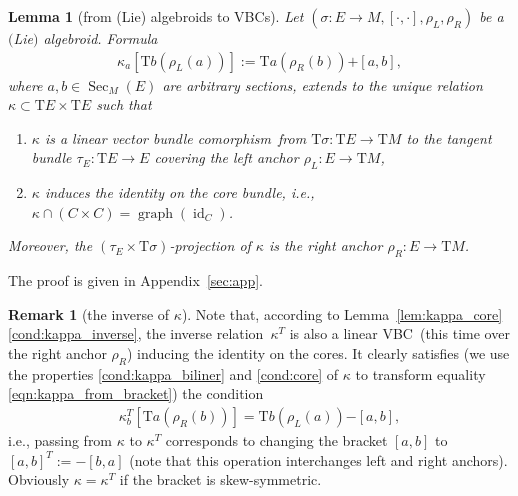 \documentclass[10pt,a4paper]{amsart}
\newcommand{\ZM}{{VBC}} %
\newcommand{\Zakrzewski}{{vector bundle comorphism}}
\newcommand{\graf}{\operatorname{graph}}
\newcommand{\Sec}{\operatorname{Sec}}
\newcommand{\id}{\operatorname{id}}
\newcommand{\ra}{\rightarrow}
\newcommand{\plus}{\boldsymbol{\pmb{+}}}
\newcommand{\minus}{\boldsymbol{\pmb{-}}}
\newcommand{\rhoL}{\rho_L} %
\newcommand{\rhoR}{\rho_R}
\newcommand{\T}{\mathrm{T}} %
\numberwithin{equation}{section}
\newtheorem{lem}[thm]{Lemma}
\theoremstyle{definition}
\newtheorem{rem}[thm]{Remark}
\begin{document}
\begin{lem}[from (Lie) algebroids to \ZM s]\label{lem:kappa_from_sigma} Let $(\sigma\colon E\ra M,[\cdot,\cdot], \rhoL,\rhoR)$ be a $($Lie$)$ algebroid. Formula
\begin{gather}\label{eqn:kappa_from_bracket}
\kappa_a\left[\T b(\rhoL(a))\right]:=\T a(\rhoR(b))\plus [a,b],
\end{gather}
where $a,b\in \Sec_M(E)$ are arbitrary sections, extends to the unique relation $\kappa\subset\T E\times \T E$ such that
\begin{enumerate}[$(i)$]\itemsep=0pt
	\item\label{cond:kappa_biliner} $\kappa$ is a linear \Zakrzewski\ from $\T\sigma\colon \T E\ra \T M$ to the tangent bundle $\tau_E\colon \T E\ra E$ covering the left anchor $\rhoL\colon E\ra \T M$,
	\item\label{cond:core} $\kappa$ induces the identity on the core bundle, i.e., $\kappa\cap(C\times C)=\graf(\id_C)$.
\end{enumerate}
Moreover, the $(\tau_E\times \T\sigma)$-projection of $\kappa$ is the right anchor $\rhoR\colon E\ra \T M$.
\end{lem}
 The proof is given in Appendix~\ref{sec:app}.

\begin{rem}[the inverse of $\kappa$]\label{rem:kappa_T} Note that, according to Lemma~\ref{lem:kappa_core}\eqref{cond:kappa_inverse}, the inverse relation~$\kappa^T$ is also a linear
\ZM\ (this time over the right anchor $\rhoR$) inducing the identity on the cores.
It clearly satisfies (we use the properties \eqref{cond:kappa_biliner} and \eqref{cond:core} of $\kappa$ to transform equality \eqref{eqn:kappa_from_bracket}) the condition
\begin{gather*} \kappa_b^T\left[\T a(\rhoR(b))\right]=\T b(\rhoL(a))\minus [a,b],\end{gather*}
i.e., passing from $\kappa$ to $\kappa^T$ corresponds to changing the bracket $[a,b]$ to $[a,b]^T:=-[b,a]$ (note that this operation interchanges left and right anchors). Obviously $\kappa=\kappa^T$ if the bracket is skew-symmetric.
\end{rem}
\end{document}
